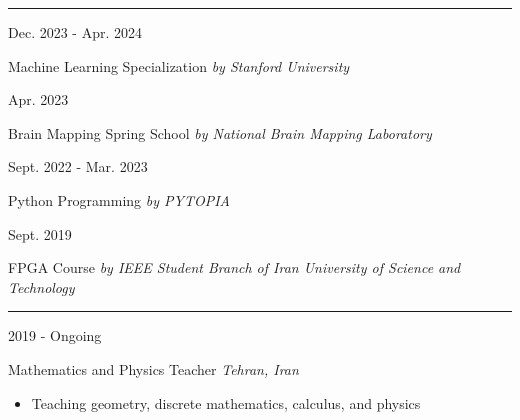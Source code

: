 \documentclass[a4paper,10pt]{article}
\newlength{\cvcolumngapwidth}
\newlength{\cvleftcolumnwidth}
\newlength{\cvrightcolumnwidth}
\newcommand{\cvsectionstyle}[1]{{\normalsize\cvsectionfont\textcolor{cvsectioncolor}{#1}}}
\newcommand{\cvtitlestyle}[1]{{\large\cvtitlefont\textcolor{cvtitlecolor}{#1}}}
\newcommand{\cvdurationstyle}[1]{{\small\cvdurationfont\textcolor{cvdurationcolor}{#1}}}
\newlength{\cvafteritemskipamount}
\newlength{\cvaftersectionskipamount}
\newlength{\cvaftertitleskipamount}
\newlength{\cvparskip}
\newcommand{\cvsection}[1]{
    \begin{minipage}[t]{\cvleftcolumnwidth}
        \raggedleft\cvsectionstyle{#1}
    \end{minipage}%
    \hspace{\cvcolumngapwidth}%
    \begin{minipage}[t]{\cvrightcolumnwidth}
        \textcolor{cvrulecolor}{\rule{\cvrightcolumnwidth}{0.3mm}}
    \end{minipage}

    \vspace{\cvaftersectionskipamount}
}
\newcommand{\cvitem}[2]{
    \begin{minipage}[t]{\cvleftcolumnwidth}
        \raggedleft #1
    \end{minipage}%
    \hspace{\cvcolumngapwidth}%
    \begin{minipage}[t]{\cvrightcolumnwidth}
        \setlength{\parskip}{\cvparskip} #2
    \end{minipage}

    \vspace{\cvafteritemskipamount}
}
\newcommand{\cvtitle}[1]{
    \cvtitlestyle{#1}

    \vspace{\cvaftertitleskipamount}
    \vspace{-\cvparskip}
}
\begin{document}
\cvsection{Online Course}
\cvitem{
    \cvdurationstyle{Dec. 2023 - Apr. 2024}
}{
    \cvtitle{{Machine Learning Specialization} \textit{\small{by Stanford University}}}
}
\vspace{-4mm}
\cvitem{
    \cvdurationstyle{Apr. 2023}
}{
    \cvtitle{{Brain Mapping Spring School} \textit{\small {by National Brain Mapping Laboratory}}}
}

\vspace{-4mm}
\cvitem{
    \cvdurationstyle{Sept. 2022 - Mar. 2023}
}{
    \cvtitle{{Python Programming} \textit{\small{by PYTOPIA}}}
}
\vspace{-4mm}
\cvitem{
    \cvdurationstyle{Sept. 2019}
}{
    \cvtitle{{FPGA Course} \textit{\small{by IEEE Student Branch of Iran University of Science and Technology}}}
}

\cvsection{Volunteer Experience}
\cvitem{
    \cvdurationstyle{2019 - Ongoing}
}{
    \cvtitle{{Mathematics and Physics Teacher} \hfill{\textnormal{\textit{Tehran, Iran}}}}
    {}
    \begin{itemize}[leftmargin=*]
        \item Teaching geometry, discrete mathematics, calculus, and physics
    \end{itemize}
}
\end{document}
